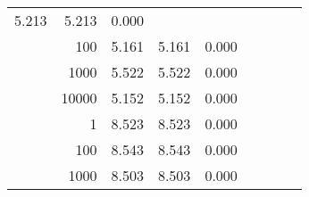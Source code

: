 \begin{table}
\begin{tabular}{rrrrrrrrr}
						
							    
							    
	                           5.213 & 5.213 & 0.000  \\
	                
	            
					 &  
					 
					\multirow{ 1 }{*}{ 100 } &
					
						
							    
							    
	                           5.161 & 5.161 & 0.000  \\
	                
	            
					 &  
					 
					\multirow{ 1 }{*}{ 1000 } &
					
						
							    
							    
	                           5.522 & 5.522 & 0.000  \\
	                
	            
					 &  
					 
					\multirow{ 1 }{*}{ 10000 } &
					
						
							    
							    
	                           5.152 & 5.152 & 0.000  \\
	                
	            
	        
				\noalign{\smallskip}\hline
				\multirow{ 4 }{*}{ 1000000 } &
				
					
					 
					\multirow{ 1 }{*}{ 1 } &
					
						
							    
							    
	                           8.523 & 8.523 & 0.000  \\
	                
	            
					 &  
					 
					\multirow{ 1 }{*}{ 100 } &
					
						
							    
							    
	                           8.543 & 8.543 & 0.000  \\
	                
	            
					 &  
					 
					\multirow{ 1 }{*}{ 1000 } &
					
						
							    
							    
	                           8.503 & 8.503 & 0.000  \\
	                

\end{tabular}
\end{table}
